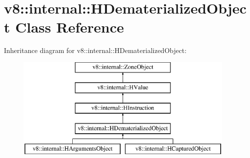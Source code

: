 \hypertarget{classv8_1_1internal_1_1_h_dematerialized_object}{}\section{v8\+:\+:internal\+:\+:H\+Dematerialized\+Object Class Reference}
\label{classv8_1_1internal_1_1_h_dematerialized_object}
Inheritance diagram for v8\+:\+:internal\+:\+:H\+Dematerialized\+Object\+:\begin{figure}[H]
\begin{center}
\leavevmode
\includegraphics[height=5.000000cm]{classv8_1_1internal_1_1_h_dematerialized_object}
\end{center}
\end{figure}
